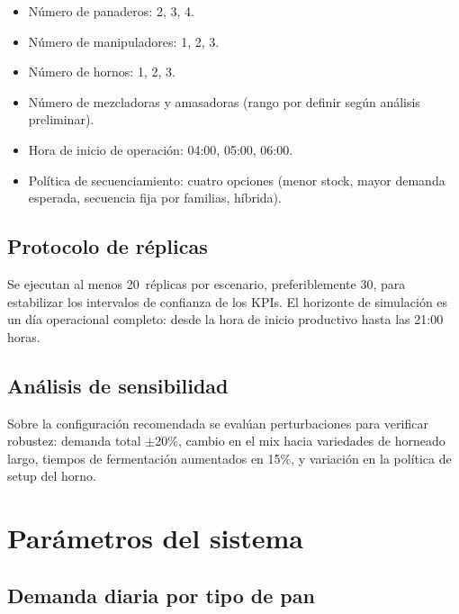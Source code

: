 \documentclass[12pt]{article}
\begin{document}
\begin{itemize}
  \item Número de panaderos: 2, 3, 4.
  \item Número de manipuladores: 1, 2, 3.
  \item Número de hornos: 1, 2, 3.
  \item Número de mezcladoras y amasadoras (rango por definir según análisis preliminar).
  \item Hora de inicio de operación: 04:00, 05:00, 06:00.
  \item Política de secuenciamiento: cuatro opciones (menor stock, mayor demanda esperada, secuencia fija por familias, híbrida).
\end{itemize}

\subsection{Protocolo de réplicas}

Se ejecutan al menos 20~réplicas por escenario, preferiblemente 30, para estabilizar los intervalos de confianza de los KPIs. El horizonte de simulación es un día operacional completo: desde la hora de inicio productivo hasta las 21:00 horas.

\subsection{Análisis de sensibilidad}

Sobre la configuración recomendada se evalúan perturbaciones para verificar robustez: demanda total $\pm$20\%, cambio en el mix hacia variedades de horneado largo, tiempos de fermentación aumentados en 15\%, y variación en la política de setup del horno.

\appendix
\newpage
\section{Parámetros del sistema}

\subsection{Demanda diaria por tipo de pan}
\end{document}
